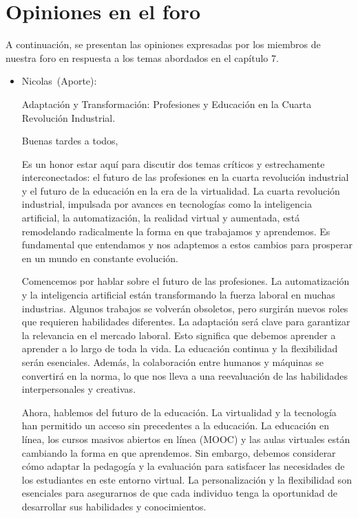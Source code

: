 \documentclass[letterpaper, 12pt]{article}
\newcommand{\memberNicolas}{Nicolas~}
\begin{document}

\section*{Opiniones en el foro}

A continuación, se presentan las opiniones expresadas por
los miembros de nuestra foro en respuesta a los temas
abordados en el capítulo 7.

\begin{itemize}[label=$\triangleright$]
    \item \memberNicolas (Aporte):

          Adaptación y Transformación: Profesiones y Educación en la
          Cuarta Revolución Industrial.

          Buenas tardes a todos,

          Es un honor estar aquí para discutir dos temas críticos y
          estrechamente interconectados: el futuro de las profesiones
          en la cuarta revolución industrial y el futuro de la
          educación en la era de la virtualidad. La cuarta revolución
          industrial, impulsada por avances en tecnologías como la
          inteligencia artificial, la automatización, la realidad
          virtual y aumentada, está remodelando radicalmente la forma
          en que trabajamos y aprendemos. Es fundamental que
          entendamos y nos adaptemos a estos cambios para prosperar
          en un mundo en constante evolución.

          Comencemos por hablar sobre el futuro de las profesiones.
          La automatización y la inteligencia artificial están
          transformando la fuerza laboral en muchas industrias.
          Algunos trabajos se volverán obsoletos, pero surgirán
          nuevos roles que requieren habilidades diferentes. La
          adaptación será clave para garantizar la relevancia en el
          mercado laboral. Esto significa que debemos aprender a
          aprender a lo largo de toda la vida. La educación continua
          y la flexibilidad serán esenciales. Además, la colaboración
          entre humanos y máquinas se convertirá en la norma, lo que
          nos lleva a una reevaluación de las habilidades
          interpersonales y creativas.

          Ahora, hablemos del futuro de la educación. La virtualidad
          y la tecnología han permitido un acceso sin precedentes a
          la educación. La educación en línea, los cursos masivos
          abiertos en línea (MOOC) y las aulas virtuales están
          cambiando la forma en que aprendemos. Sin embargo, debemos
          considerar cómo adaptar la pedagogía y la evaluación para
          satisfacer las necesidades de los estudiantes en este
          entorno virtual. La personalización y la flexibilidad son
          esenciales para asegurarnos de que cada individuo tenga la
          oportunidad de desarrollar sus habilidades y conocimientos.


\end{itemize}
\end{document}
